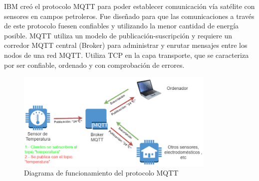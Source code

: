 IBM creó el protocolo MQTT para poder establecer comunicación vía satélite con sensores en campos petroleros. Fue diseñado para que las comunicaciones a través de este protocolo fuesen confiables y utilizando la menor cantidad de energía posible. MQTT utiliza un modelo de publicación-suscripción y requiere un corredor MQTT central (Broker) para administrar y enrutar mensajes entre los nodos de una red MQTT. Utiliza TCP en la capa transporte, que se caracteriza por ser confiable, ordenado y con comprobación de errores.\cite{iotprocolslinkedin}\\

\begin{figure}[ht]
\centering
\includegraphics[width=0.85\textwidth]{./Figuras/mqtt.png}
\caption{\label{fig:mqttprotocol}Diagrama de funcionamiento del protocolo MQTT}
\vspace*{-10pt}
\end{figure}

